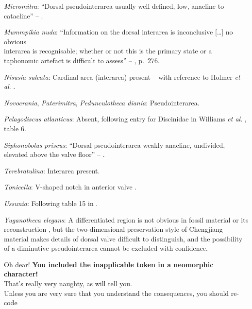 \documentclass[openany]{book}
\theoremstyle{definition}
\theoremstyle{definition}
\theoremstyle{definition}
\theoremstyle{remark}
\begin{document}
\hypertarget{Micromitra-coding-76}{}
\emph{Micromitra}: ``Dorsal pseudointerarea usually well defined, low,
anacline to catacline'' --
\citet{Williams2000LinguliformeaCraniiformea}.

\hypertarget{Mummpikia_nuda-coding-76}{}
\emph{Mummpikia nuda}: ``Information on the dorsal interarea is
inconclusive {[}\ldots{}{]} no obvious\\
interarea is recognisable; whether or not this is the primary state or a
taphonomic artefact is difficult to assess'' --
\citet{Balthasar2008iMummpikia}, p.~276.

\hypertarget{Nisusia_sulcata-coding-76}{}
\emph{Nisusia sulcata}: Cardinal area (interarea) present -- with
reference to Holmer \emph{et al}.
\citeyearpar{Holmer2018Evolutionarysignificance}.

\hypertarget{Novocrania-coding-76}{}
\emph{Novocrania}, \emph{Paterimitra}, \emph{Pedunculotheca diania}:
Pseudointerarea.

\hypertarget{Pelagodiscus_atlanticus-coding-76}{}
\emph{Pelagodiscus atlanticus}: Absent, following entry for Discinidae
in Williams \emph{et al}.
\citeyearpar{Williams2000LinguliformeaCraniiformea}, table 6.

\hypertarget{Siphonobolus_priscus-coding-76}{}
\emph{Siphonobolus priscus}: ``Dorsal pseudointerarea weakly anacline,
undivided, elevated above the valve floor'' --
\citet{Popov2009Earlyontogeny}.

\hypertarget{Terebratulina-coding-76}{}
\emph{Terebratulina}: Interarea present.

\hypertarget{Tonicella-coding-76}{}
\emph{Tonicella}: V-shaped notch in anterior valve \citep{Schwabe2010}.

\hypertarget{Ussunia-coding-76}{}
\emph{Ussunia}: Following table 15 in
\citet{Williams2000LinguliformeaCraniiformea}.

\hypertarget{Yuganotheca_elegans-coding-76}{}
\emph{Yuganotheca elegans}: A differentiated region is not obvious in
fossil material or its reconstruction \citep{Zhang2014Anearly}, but the
two-dimensional preservation style of Chengjiang material makes details
of dorsal valve difficult to distinguish, and the possibility of a
diminutive pseudointerarea cannot be excluded with confidence.

Oh dear! \textbf{You included the inapplicable token in a neomorphic
character!}\\
That's really very naughty, as \citet{Brazeau2018} will tell you.\\
Unless you are very sure that you understand the consequences, you
should re-code
\end{document}
